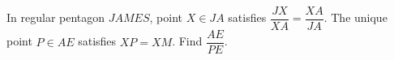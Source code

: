 In regular pentagon $JAMES$, point $X\in JA$ satisfies $\dfrac{JX}{XA}=\dfrac{XA}{JA}$. The unique point $P\in AE$ satisfies $XP=XM$. Find $\dfrac{AE}{PE}$.
